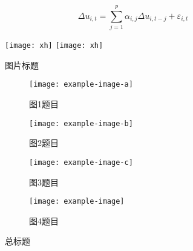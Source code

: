 \documentclass[UTF8]{ctexart}
\begin{document}
\begin{equation}
	\Delta u_{i,t} = \sum_{j=1}^{p} \alpha_{i,j} \Delta u_{i,t-j} + \varepsilon_{i,t}   \label{eq:example}
\end{equation}
\begin{figure}[p]
	\centering
	\texttt{[image: xh]}
	\quad	\texttt{[image: xh]}
	\caption{图片标题}
	
	\label{fig:myphoto}
\end{figure}

\begin{figure}
	\centering
	\begin{subfigure}{0.3\textwidth}
		\centering
		\texttt{[image: example-image-a]}
		\caption{图1题目}
		\label{fig:subfig1}
	\end{subfigure}
	\hspace{0.2\textwidth} %
	\begin{subfigure}{0.3\textwidth}
		\centering
		\texttt{[image: example-image-b]}
		\caption{图2题目}
		\label{fig:subfig2}
	\end{subfigure}
	
	\medskip %
	
	\begin{subfigure}{0.4\textwidth}
		\centering
		\texttt{[image: example-image-c]}
		\caption{图3题目}
		\label{fig:subfig3}
	\end{subfigure}
	\hspace{0.1\textwidth} %
	\begin{subfigure}{0.4\textwidth}
		\centering
		\texttt{[image: example-image]}
		\caption{图4题目}
		\label{fig:subfig4}
	\end{subfigure}
	
	\caption{总标题}
	\label{fig:total}
\end{figure}
\end{document}
